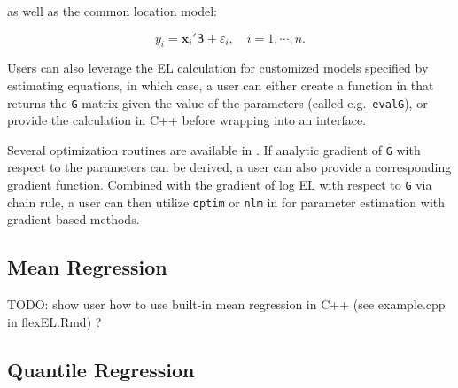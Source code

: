 \documentclass[article]{jss}
\newenvironment{Shaded}{\begin{snugshade}}{\end{snugshade}}
\newcommand{\ControlFlowTok}[1]{\textcolor[rgb]{0.13,0.29,0.53}{\textbf{#1}}}
\newcommand{\FunctionTok}[1]{\textcolor[rgb]{0.00,0.00,0.00}{#1}}
\newcommand{\NormalTok}[1]{#1}
\newcommand{\OtherTok}[1]{\textcolor[rgb]{0.56,0.35,0.01}{#1}}
\newcommand{\SpecialCharTok}[1]{\textcolor[rgb]{0.00,0.00,0.00}{#1}}
\renewcommand{\|}{\,|\,}
\begin{document}
as well as the common location model:

\begin{equation} \label{md:lmod}
  y_i = \bm x_i'\bm \beta+ \varepsilon_i, \quad i=1,\cdots,n.
\end{equation}

Users can also leverage the EL calculation for customized models specified by estimating equations, in which case, a user can either create a function in  that returns the \texttt{G} matrix given the value of the parameters (called e.g.~\texttt{evalG}), or provide the calculation in C++ before wrapping into an  interface.

Several optimization routines are available in . If analytic gradient of \texttt{G} with respect to the parameters can be derived, a user can also provide a corresponding gradient function. Combined with the gradient of log EL with respect to \texttt{G} via chain rule, a user can then utilize \texttt{optim} or \texttt{nlm} in  for parameter estimation with gradient-based methods.

\hypertarget{mean-regression}{%
\subsection{Mean Regression}\label{mean-regression}}

TODO: show user how to use built-in mean regression in C++ (see example.cpp in flexEL.Rmd) ?

\begin{Shaded}
\end{Shaded}

\hypertarget{quantile-regression}{%
\subsection{Quantile Regression}\label{quantile-regression}}
\end{document}
